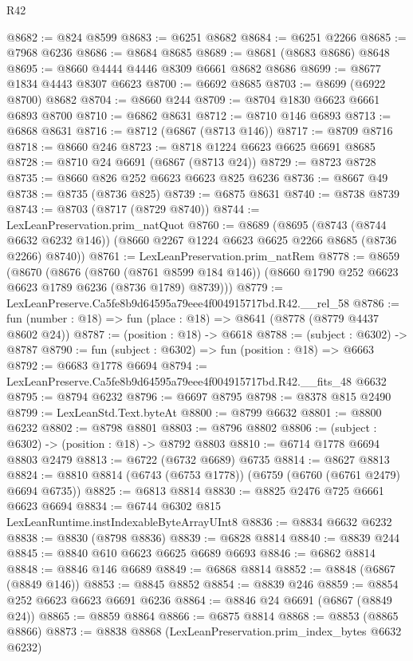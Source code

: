 \begin{lexlean}{R42}
\begin{coremodule}
{@8682 := @824 @8599
@8683 := @6251 @8682
@8684 := @6251 @2266
@8685 := @7968 @6236
@8686 := @8684 @8685
@8689 := @8681 (@8683 @8686) @8648
@8695 := @8660 @4444 @4446 @8309 @6661 @8682 @8686
@8699 := @8677 @1834 @4443 @8307 @6623
@8700 := @6692 @8685
@8703 := @8699 (@6922 @8700) @8682
@8704 := @8660 @244
@8709 := @8704 @1830 @6623 @6661 @6893 @8700
@8710 := @6862 @8631
@8712 := @8710 @146 @6893
@8713 := @6868 @8631
@8716 := @8712 (@6867 (@8713 @146))
@8717 := @8709 @8716
@8718 := @8660 @246
@8723 := @8718 @1224 @6623 @6625 @6691 @8685
@8728 := @8710 @24 @6691 (@6867 (@8713 @24))
@8729 := @8723 @8728
@8735 := @8660 @826 @252 @6623 @6623 @825 @6236
@8736 := @8667 @49
@8738 := @8735 (@8736 @825)
@8739 := @6875 @8631
@8740 := @8738 @8739
@8743 := @8703 (@8717 (@8729 @8740))
@8744 := LexLeanPreservation.prim_natQuot
@8760 := @8689
    (@8695
      (@8743 (@8744 @6632 @6232 @146))
      (@8660 @2267 @1224 @6623 @6625 @2266 @8685 (@8736 @2266) @8740))
@8761 := LexLeanPreservation.prim_natRem
@8778 := @8659
    (@8670
      (@8676
        (@8760 (@8761 @8599 @184 @146))
        (@8660 @1790 @252 @6623 @6623 @1789 @6236 (@8736 @1789) @8739)))
@8779 := LexLeanPreserve.Ca5fe8b9d64595a79eee4f004915717bd.R42.__rel_58
@8786 := fun (number : @18) => fun (place : @18) => @8641 (@8778 (@8779 @4437 @8602 @24))
@8787 := (position : @18) -> @6618
@8788 := (subject : @6302) -> @8787
@8790 := fun (subject : @6302) => fun (position : @18) => @6663
@8792 := @6683 @1778 @6694
@8794 := LexLeanPreserve.Ca5fe8b9d64595a79eee4f004915717bd.R42.__fits_48 @6632
@8795 := @8794 @6232
@8796 := @6697 @8795
@8798 := @8378 @815 @2490
@8799 := LexLeanStd.Text.byteAt
@8800 := @8799 @6632
@8801 := @8800 @6232
@8802 := @8798 @8801
@8803 := @8796 @8802
@8806 := (subject : @6302) -> (position : @18) -> @8792 @8803
@8810 := @6714 @1778 @6694 @8803 @2479
@8813 := @6722 (@6732 @6689) @6735
@8814 := @8627 @8813
@8824 := @8810 @8814 (@6743 (@6753 @1778)) (@6759 (@6760 (@6761 @2479) @6694 @6735))
@8825 := @6813 @8814
@8830 := @8825 @2476 @725 @6661 @6623 @6694
@8834 := @6744 @6302 @815 LexLeanRuntime.instIndexableByteArrayUInt8
@8836 := @8834 @6632 @6232
@8838 := @8830 (@8798 @8836)
@8839 := @6828 @8814
@8840 := @8839 @244
@8845 := @8840 @610 @6623 @6625 @6689 @6693
@8846 := @6862 @8814
@8848 := @8846 @146 @6689
@8849 := @6868 @8814
@8852 := @8848 (@6867 (@8849 @146))
@8853 := @8845 @8852
@8854 := @8839 @246
@8859 := @8854 @252 @6623 @6623 @6691 @6236
@8864 := @8846 @24 @6691 (@6867 (@8849 @24))
@8865 := @8859 @8864
@8866 := @6875 @8814
@8868 := @8853 (@8865 @8866)
@8873 := @8838 @8868 (LexLeanPreservation.prim_index_bytes @6632 @6232)
}
\end{coremodule}
\end{lexlean}
